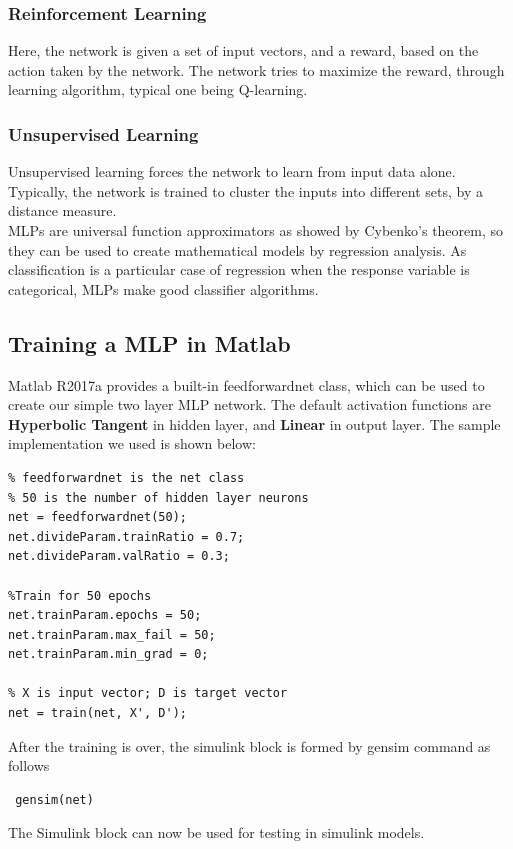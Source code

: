 \documentclass[12pt, onecolumn]{extarticle}
\begin{document}
\subsubsection{Reinforcement Learning} Here, the network is given a set of input vectors, and a reward, based on the action taken by the network. The network tries to maximize the reward, through learning algorithm, typical one being Q-learning. \\
\subsubsection{Unsupervised Learning} Unsupervised learning forces the network to learn from input data alone. Typically, the network is trained to cluster the inputs into different sets, by a distance measure. \\

MLPs are universal function approximators as showed by Cybenko's theorem, so they can be used to create mathematical models by regression analysis. As classification is a particular case of regression when the response variable is categorical, MLPs make good classifier algorithms.
\subsection{Training a MLP in Matlab} Matlab R2017a provides a built-in feedforwardnet class, which can be used to create our simple two layer MLP network. The default activation functions are \textbf{Hyperbolic Tangent} in hidden layer, and \textbf{Linear} in output layer. The sample implementation we used is shown  below: 
\begin{verbatim}
% feedforwardnet is the net class
% 50 is the number of hidden layer neurons
net = feedforwardnet(50); 		
net.divideParam.trainRatio = 0.7;		
net.divideParam.valRatio = 0.3;

%Train for 50 epochs
net.trainParam.epochs = 50;				
net.trainParam.max_fail = 50;
net.trainParam.min_grad = 0;

% X is input vector; D is target vector
net = train(net, X', D');
\end{verbatim}
 
 After the training is over, the simulink block is formed by gensim command as follows 
 \begin{verbatim}	
 gensim(net)
 \end{verbatim}
 
 The Simulink block can now be used for testing in simulink models.
\end{document}
